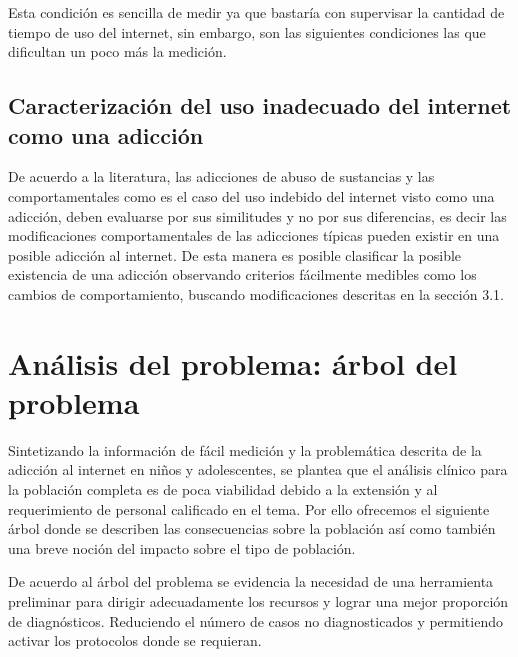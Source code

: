 \documentclass[10pt,letterpaper]{article}
\begin{document}
Esta condición es sencilla de medir ya que bastaría con supervisar la cantidad de tiempo de uso del internet, sin embargo, son las siguientes condiciones las que dificultan un poco más la medición.  

\subsection{Caracterización del uso inadecuado del internet como una adicción}
De acuerdo a la literatura, \citep{griffithsbehavioural} las adicciones de abuso de sustancias y las comportamentales como es el caso del uso indebido del internet visto como una adicción, deben evaluarse por sus similitudes y no por sus diferencias, es decir las modificaciones comportamentales de las adicciones típicas pueden existir en una posible adicción al internet. De esta manera es posible clasificar la posible existencia de una adicción observando criterios fácilmente medibles como los cambios de comportamiento, buscando modificaciones descritas en la sección 3.1.


\newpage
\section{Análisis del problema: árbol del problema}
Sintetizando la información de fácil medición y la problemática descrita de la adicción al internet en niños y adolescentes, se plantea que el análisis clínico para la población completa es de poca viabilidad debido a la extensión y al requerimiento de personal calificado en el tema. Por ello ofrecemos el siguiente árbol donde se describen las consecuencias sobre la población así como también una breve noción del impacto sobre el tipo de población.

De acuerdo al árbol del problema se evidencia la necesidad de una herramienta preliminar para dirigir adecuadamente los recursos y lograr una mejor proporción de diagnósticos. Reduciendo el número de casos no diagnosticados y permitiendo activar los protocolos donde se requieran.



\end{document}
